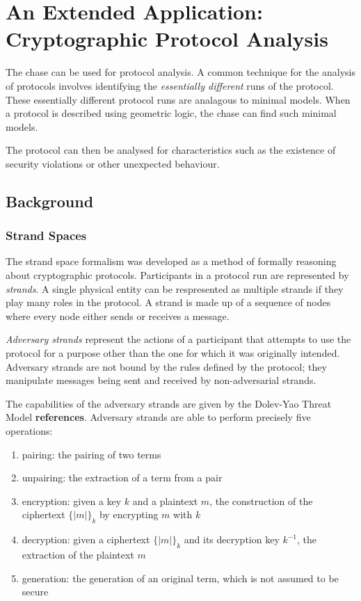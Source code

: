 \section{An Extended Application: \\ Cryptographic Protocol Analysis}

	The chase can be used for protocol analysis. A common technique for the analysis
	of protocols involves identifying the \emph{essentially different} runs of
	the protocol. These essentially different protocol runs are analagous to
	minimal models. When a protocol is described using geometric logic, the
	chase can find such minimal models.

	The protocol can then be analysed for characteristics such as the
	existence of security violations or other unexpected behaviour.

	\subsection{Background}

		\subsubsection{Strand Spaces}

			The strand space formalism was developed as a method of formally
			reasoning about cryptographic protocols. Participants in a protocol
			run are represented by \emph{strands}. A single physical entity can
			be respresented as multiple strands if they play many roles in the
			protocol. A strand is made up of a sequence of nodes where every
			node either sends or receives a message.

			\emph{Adversary strands} represent the actions of a participant
			that attempts to use the protocol for a purpose other than the one
			for which it was originally intended. Adversary strands are not
			bound by the rules defined by the protocol; they manipulate
			messages being sent and received by non-adversarial strands.

			The capabilities of the adversary strands are given by the
			Dolev-Yao Threat Model \textbf{references}. Adversary strands are
			able to perform precisely five operations:

			\begin{enumerate}
			\item pairing: the pairing of two terms
			\item unpairing: the extraction of a term from a pair
			\item encryption: given a key $k$ and a plaintext $m$, the construction of the ciphertext $\{|m|\}_k$ by encrypting $m$ with $k$
			\item decryption: given a ciphertext $\{|m|\}_k$ and its decryption key $k^{-1}$, the extraction of the plaintext $m$
			\item generation: the generation of an original term, which is not assumed to be secure
			\end{enumerate}

